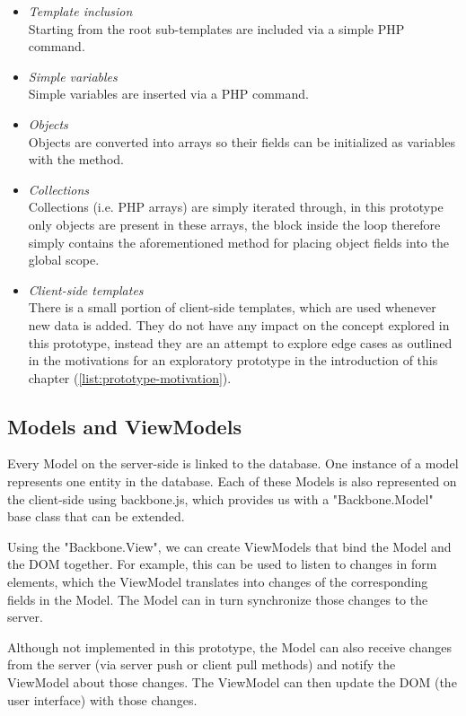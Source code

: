 \begin{itemize}
	\item \emph{Template inclusion}\\
	Starting from the root sub-templates are included via a simple
	PHP  command.
	\item \emph{Simple variables}\\
	Simple variables are inserted via a PHP  command.
	\item \emph{Objects}\\
	Objects are converted into arrays so their fields can be initialized as
	variables with the  method.
	\item \emph{Collections}\\
	Collections (i.e. PHP arrays) are simply iterated through, in this prototype
	only objects are present in these arrays, the block inside the
	 loop therefore simply contains the aforementioned method
	for placing object fields into the global scope.
	\item \emph{Client-side templates}\\
	There is a small portion of client-side templates, which are used whenever new
	data is added.  They do not have any impact on the concept explored in
	this prototype, instead they are an attempt to explore edge cases as outlined
	in the motivations for an exploratory prototype in the introduction of this
	chapter (\ref{list:prototype-motivation}).
\end{itemize}

\subsection{Models and ViewModels}
Every Model on the server-side is linked to the database.
One instance of a model represents one entity in the database.
Each of these Models is also represented on the client-side using backbone.js,
which provides us with a "Backbone.Model" base class that can be extended.

Using the "Backbone.View", we can create ViewModels that bind the Model and the
DOM together. For example, this can be used to listen to changes in
form elements, which the ViewModel translates into changes of the corresponding
fields in the Model. The Model can in turn synchronize those changes to the
server.

Although not implemented in this prototype, the Model can also receive changes
from the server (via server push or client pull methods) and notify
the ViewModel about those changes. The ViewModel can then update the
DOM (the user interface) with those changes.


